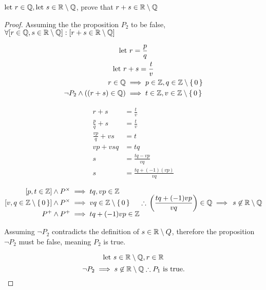 \question ${\text{let } } r \in {\mathbb Q}, {\text{let } } s \in {\mathbb R}\setminus{\mathbb Q}$, prove that $r+s \in {\mathbb R}\setminus{\mathbb Q}$

\begin{proof}
	Assuming the the proposition $P_2$ to be false, $\forall { \left[ {r \in {\mathbb Q}, s \in {\mathbb R}\setminus{\mathbb Q}} \right] } : { \left[ {r+s \in {\mathbb R}\setminus{\mathbb Q}} \right] }$

	\begin{gather*}
		{\text{let } } r  = \frac{p}{q} \\
		{\text{let } } r+s = \frac{t}{v} \\
		\begin{split}
			r \in {\mathbb Q}                               & \implies p \in {\mathbb Z}, q \in {\mathbb Z}\setminus\set{0}  \\
			\neg P_2 \wedge { \left( { \left(r+s\right) } \in {\mathbb Q}\right) } & \implies  t \in {\mathbb Z}, v \in {\mathbb Z}\setminus\set{0}
		\end{split}
	\end{gather*}

	\begin{align*}
		r + s             & = \frac{t}{v}               \\
		\frac{p}{q} + s   & = \frac{t}{v}               \\
		\frac{vp}{q} + vs & = t                         \\
		vp + vsq          & = tq                        \\
		s                 & = \frac{tq-vp}{vq}          \\
		s                 & = \frac{tq + (-1)(vp) }{vq}
	\end{align*}

	\begin{equation*}
		\begin{split}
			{ \left[ {p,t\in {\mathbb Z}} \right] } \wedge P^{\times}                     & \implies {tq, vp} \in {\mathbb Z}             \\
			{ \left[ {v,q \in {\mathbb Z} \setminus \set{0} } \right] } \wedge P^{\times} & \implies vq \in {\mathbb Z} \setminus \set{0} \\
			P^{+} \wedge P^{+}                                   & \implies tq+(-1)vp \in {\mathbb Z}            \\
		\end{split}
		\therefore\,                                          { \left(\frac{tq+(-1)vp}{vq}\right) } \in {\mathbb Q}
		\implies\,                                        s \not\in {\mathbb R}\setminus{\mathbb Q}
	\end{equation*}

	Assuming $\neg P_2$ contradicts the definition of $s \in {\mathbb R}\setminus Q$, therefore the proposition $\neg P_2$ must be false, meaning $P_2$ is true.

	$$ {\text{let } } s \in {\mathbb R}\setminus{\mathbb Q}, r\in {\mathbb R}$$
	$$ \neg P_2 \implies s \not\in {\mathbb R}\setminus{\mathbb Q} \therefore P_1 \text{ is true.}$$
\end{proof}
